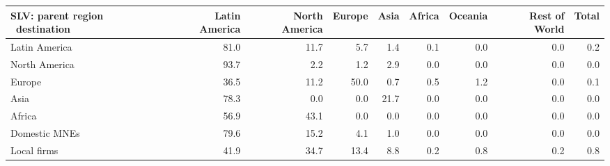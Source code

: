 \begin{tabular}{lrrrrrrrr}
\toprule
SLV: parent region \ destination & Latin America & North America & Europe & Asia & Africa & Oceania & Rest of World & Total \\
\midrule
Latin America & 81.0 & 11.7 & 5.7 & 1.4 & 0.1 & 0.0 & 0.0 & 0.2 \\
North America & 93.7 & 2.2 & 1.2 & 2.9 & 0.0 & 0.0 & 0.0 & 0.0 \\
Europe & 36.5 & 11.2 & 50.0 & 0.7 & 0.5 & 1.2 & 0.0 & 0.1 \\
Asia & 78.3 & 0.0 & 0.0 & 21.7 & 0.0 & 0.0 & 0.0 & 0.0 \\
Africa & 56.9 & 43.1 & 0.0 & 0.0 & 0.0 & 0.0 & 0.0 & 0.0 \\
Domestic MNEs & 79.6 & 15.2 & 4.1 & 1.0 & 0.0 & 0.0 & 0.0 & 0.0 \\
Local firms & 41.9 & 34.7 & 13.4 & 8.8 & 0.2 & 0.8 & 0.2 & 0.8 \\
\bottomrule
\end{tabular}
